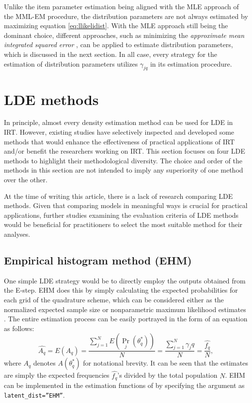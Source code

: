 Unlike the item parameter estimation being aligned with the MLE approach of the
MML-EM procedure, the distribution parameters are not always estimated by
maximizing equation \eqref{eq:llikelidist}. With the MLE approach still
being the dominant choice, different approaches, such as minimizing the \emph{approximate mean integrated squared error} \citep{Li:2022}, can be applied
to estimate distribution parameters, which is discussed in the
next section. In all case, every strategy for the estimation of
distribution parameters utilizes \(\gamma_{jq}\) in its
estimation procedure.

\hypertarget{lde-methods}{%
\section{LDE methods}\label{lde-methods}}

In principle, almost every density estimation method can be used for LDE in IRT.
However, existing studies have
selectively inspected and developed some methods that would enhance the
effectiveness of practical applications of IRT and/or benefit the
researchers working on IRT. This section focuses on four LDE
methods to highlight their methodological diversity. The choice
and order of the methods in this section are not intended to imply any
superiority of one method over the other.

At the time of writing this article, there is a lack of research comparing
LDE methods. Given that comparing models in meaningful ways is crucial for
practical applications, further studies examining the evaluation criteria of LDE methods
would be beneficial for practitioners to select the most suitable method for their analyses.

\hypertarget{empirical-histogram-method-ehm}{%
\subsection{Empirical histogram method (EHM)}\label{empirical-histogram-method-ehm}}

One simple LDE strategy would be to directly employ the outputs
obtained from the E-step. EHM does this by simply calculating the
expected probabilities for each grid of the quadrature scheme, which can
be considered either as the normalized expected sample size or
nonparametric maximum likelihood estimates \citep{Bock+Aitkin:1981, Laird:1978, Mislevy:1984}.
The entire estimation process can be easily
portrayed in the form of an equation as follows:
\begin{equation}
\hat{ A_{q}} =
E{\left( A_{q} \right)} =
\frac{\sum_{j = 1}^{N}{ E{\left(\Pr_{j}{\left( \theta_{q}^{*} \right)}\right)} }}{N} =
\frac{\sum_{j = 1}^{N}{\gamma_jq}}{N} =
\frac{\hat{f_q}}{N},
\label{eq:ehm}
\end{equation}
where \(A_{q}\) denotes \(A{\left( \theta^{*}_{q} \right)}\) for notational brevity.
It can be seen that the estimates are simply
the expected frequencies \(\hat{f_q}\)'s divided by the total population
\(N\). EHM can be implemented in the estimation functions of
 by specifying the argument as \texttt{latent\_dist=”EHM”}.

